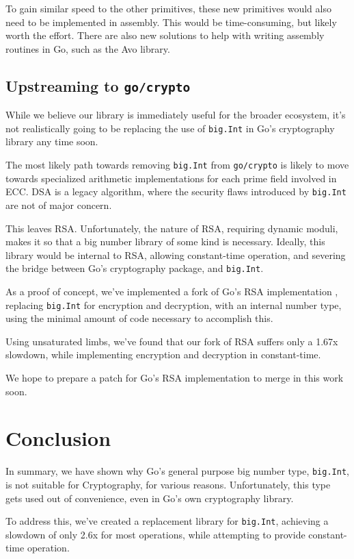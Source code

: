 \documentclass[11pt, a4paper]{article} %
\begin{document}
{To gain similar speed to the other primitives, these new primitives
would also need to be implemented in assembly. This would be time-consuming,
but likely worth the effort. There are also new solutions
to help with writing assembly routines in Go, such as the Avo library.

\subsection{Upstreaming to \texttt{go/crypto}}

While we believe our library is immediately useful for the broader
ecosystem, it's not realistically going to be replacing
the use of \texttt{big.Int} in Go's cryptography library any time soon.

The most likely path towards removing \texttt{big.Int} from
\texttt{go/crypto} is likely to move towards specialized arithmetic
implementations for each prime field involved in ECC. DSA is a legacy
algorithm, where the security flaws introduced
by \texttt{big.Int} are not of major concern.

This leaves RSA. Unfortunately, the nature of RSA, requiring dynamic
moduli, makes it so that a big number library of some kind is necessary.
Ideally, this library would be internal to RSA, allowing constant-time
operation, and severing the bridge between Go's cryptography
package, and \texttt{big.Int}.

As a proof of concept, we've implemented a fork of Go's RSA implementation
\cite{meier_cronokirbyctrsa_nodate},
replacing \texttt{big.Int} for encryption and decryption, 
with an internal number type, using the minimal amount of code
necessary to accomplish this.

Using unsaturated limbs, we've found that our fork of RSA
suffers only a 1.67x slowdown, while implementing encryption and
decryption in constant-time.

We hope to prepare a patch for Go's RSA implementation to merge
in this work soon.

\section{Conclusion}

In summary, we have shown
why Go's general purpose big number type, \texttt{big.Int},
is not suitable for Cryptography, for various reasons.
Unfortunately, this type gets used out of convenience,
even in Go's own cryptography library.

To address this, we've created a replacement library for \texttt{big.Int},
achieving a slowdown of only 2.6x for most operations, while attempting
to provide constant-time operation.

}
\end{document}
